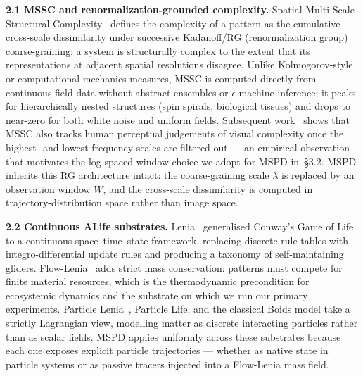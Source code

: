 \documentclass[
  11pt,
]{article}
\begin{document}
\textbf{2.1 MSSC and renormalization-grounded complexity.} Spatial
Multi-Scale Structural Complexity~\cite{bagrov2020multiscale} defines
the complexity of a pattern as the cumulative cross-scale dissimilarity
under successive Kadanoff/RG (renormalization group) \cite{wilson1974,mabook} coarse-graining: a system is structurally
complex to the extent that its representations at adjacent spatial
resolutions disagree. Unlike Kolmogorov-style or
computational-mechanics measures, MSSC is computed directly from
continuous field data without abstract ensembles or
$\epsilon$-machine inference; it peaks for hierarchically nested
structures (spin spirals, biological tissues) and drops to near-zero
for both white noise and uniform fields. Subsequent
work~\cite{kravchenko2026} shows that MSSC also tracks human
perceptual judgements of visual complexity once the highest- and
lowest-frequency scales are filtered out --- an empirical observation
that motivates the log-spaced window choice we adopt for MSPD
in~\S3.2. MSPD inherits this RG architecture intact: the
coarse-graining scale $\lambda$ is replaced by an observation window
$W$, and the cross-scale dissimilarity is computed in
trajectory-distribution space rather than image space.

\textbf{2.2 Continuous ALife substrates.}
Lenia~\cite{chan2019lenia} generalised Conway's Game of Life to a
continuous space--time--state framework, replacing discrete rule
tables with integro-differential update rules and producing a
taxonomy of self-maintaining gliders. Flow-Lenia~\cite{plantec2023flow}
adds strict mass conservation: patterns must compete for finite
material resources, which is the thermodynamic precondition for
ecosystemic dynamics and the substrate on which we run our primary
experiments. Particle Lenia~\cite{mordvintsev2022particle}, Particle
Life, and the classical Boids model take a strictly Lagrangian view,
modelling matter as discrete interacting particles rather than as
scalar fields. MSPD applies uniformly across these substrates because
each one exposes explicit particle trajectories --- whether as native
state in particle systems or as passive tracers injected into a
Flow-Lenia mass field.
\end{document}
